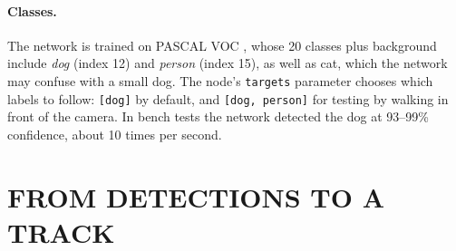 \paragraph{Classes.} The network is trained on PASCAL VOC
\cite{everingham2010pascal}, whose 20 classes plus background include
\emph{dog} (index 12) and \emph{person} (index 15), as well as cat, which
the network may confuse with a small dog. The node's \texttt{targets}
parameter chooses which labels to follow: \texttt{[dog]} by default, and
\texttt{[dog, person]} for testing by walking in front of the camera. In
bench tests the network detected the dog at 93--99\% confidence, about 10
times per second.

\section{FROM DETECTIONS TO A TRACK}
\label{sec:chasemeas}

